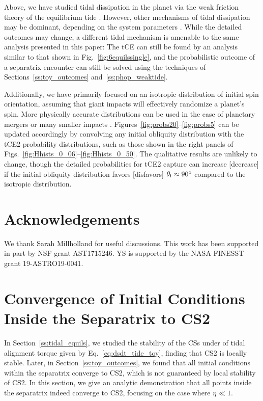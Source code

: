 \documentclass[
        fleqn,
        usenatbib,
    ]{mnras}
\begin{document}
Above, we have studied tidal dissipation in the planet via the weak friction
theory of the equilibrium tide \citep{lai2012}. However, other mechanisms of
tidal dissipation may be dominant, depending on the system parameters
\citep[e.g.][]{papaloizou_ivanov_inertial, teyssandier2019formation}. While the
detailed outcomes may change, a different tidal mechanism is amenable to the
same analysis presented in this paper: The tCE can still be found by an analysis
similar to that shown in Fig.~\ref{fig:6equilssingle}, and the probabilistic
outcome of a separatrix encounter can still be solved using the techniques of
Sections~\ref{ss:toy_outcomes} and~\ref{ss:phop_weaktide}.

Additionally, we have primarily focused on an isotropic distribution of initial
spin orientation, assuming that giant impacts will effectively randomize a
planet's spin. More physically accurate distributions can be used in the case of
planetary mergers \citep{li2020planetary} or many smaller impacts
\citep{dones1993does}. Figures~\ref{fig:probs20}--\ref{fig:probs5} can be
updated accordingly by convolving any initial obliquity distribution with the
tCE2 probability distributions, such as those shown in the right panels of
Figs.~\ref{fig:Hhists_0_06}--\ref{fig:Hhists_0_50}. The qualitative results are
unlikely to change, though the detailed probabilities for tCE2 capture can
increase [decrease] if the initial obliquity distribution favors [disfavors]
$\theta_{\rm i} \approx 90^\circ$ compared to the isotropic distribution.

\section{Acknowledgements}

We thank Sarah Millholland for useful discussions. This work has been supported
in part by NSF grant AST1715246. YS is supported by the NASA FINESST grant
19-ASTRO19-0041.%




\appendix

\onecolumn

\section{Convergence of Initial Conditions Inside the Separatrix to CS2
}\label{app:cs_stab2}

In Section~\ref{ss:tidal_equils}, we studied the stability of the CSs under of
tidal alignment torque given by Eq.~\eqref{eq:dsdt_tide_toy}, finding that CS2
is locally stable. Later, in Section~\ref{ss:toy_outcomes}, we found that all
initial conditions within the separatrix converge to CS2, which is not
guaranteed by local stability of CS2. In this section, we give an analytic
demonstration that all points inside the separatrix indeed converge to CS2,
focusing on the case where $\eta \ll 1$.
\end{document}
